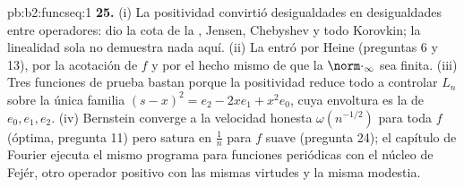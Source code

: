 \begin{solution}{pb:b2:funcseq:1}
\textbf{25.} (i) La positividad convirtió desigualdades
 en desigualdades entre operadores: dio la cota de la
, Jensen, Chebyshev y todo Korovkin; la linealidad sola no
demuestra nada aquí. (ii) La  entró por Heine (preguntas
6 y 13), por la acotación de $f$ y por el hecho mismo de que la
 $\norm\cdot_\infty$ sea finita. (iii) Tres funciones de
prueba bastan porque la positividad reduce todo a controlar $L_n$
sobre la única familia $(s-x)^2 = e_2 - 2xe_1 + x^2e_0$, cuya
envoltura es la de $e_0, e_1, e_2$. (iv) Bernstein converge a la
velocidad honesta $\omega(n^{-1/2})$ para toda $f$ 
(óptima, pregunta 11) pero satura en $\frac1n$ para $f$ suave
(pregunta 24); el capítulo de Fourier ejecuta el mismo programa
para funciones periódicas con el núcleo de Fejér, otro operador
positivo con las mismas virtudes y la misma modestia.
\end{solution}
